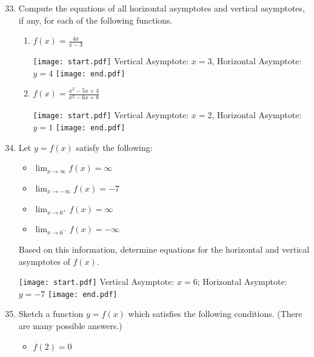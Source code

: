 \documentclass[12pt]{article}
\begin{document}
\begin{enumerate}
\setcounter{enumi}{32}

\item Compute the equations of all horizontal asymptotes and vertical asymptotes, if any, for each of the following functions.

\begin{enumerate}

\item $\displaystyle f(x)=\frac{4x}{x-3}$

\texttt{[image: start.pdf]}
{{Vertical Asymptote: $x=3$, Horizontal Asymptote: $y=4$}}
\texttt{[image: end.pdf]}


\item $\displaystyle f(x)=\frac{x^2-5x+4}{x^2-6x+8}$

\texttt{[image: start.pdf]}
{{Vertical Asymptote: $x=2$, Horizontal Asymptote: $y=1$}}
\texttt{[image: end.pdf]}


\end{enumerate}

\item Let $y=f(x)$ satisfy the following:

\begin{itemize}

\item $\displaystyle \lim_{x\rightarrow \infty}{f(x)}=\infty$

\item $\displaystyle \lim_{x\rightarrow -\infty}{f(x)}=-7$

\item $\displaystyle \lim_{x\rightarrow 6^+}{f(x)}=\infty$

\item $\displaystyle \lim_{x\rightarrow 6^-}{f(x)}=-\infty$

\end{itemize}

Based on this information, determine equations for the horizontal and vertical asymptotes of $f(x)$.

\texttt{[image: start.pdf]}
{{Vertical Asymptote: $x=6$; Horizontal Asymptote: $y=-7$}}
\texttt{[image: end.pdf]}


\item Sketch a function $y=f(x)$ which satisfies the following conditions. (There are many possible answers.)

\begin{itemize}

\item $f(2)=0$


\end{itemize}
\end{enumerate}
\end{document}
